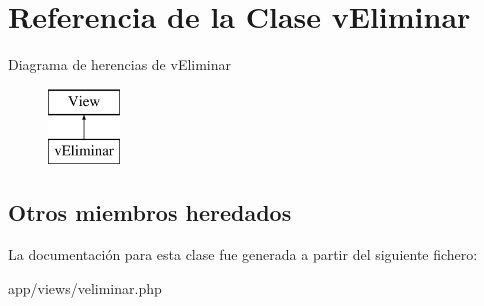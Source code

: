 \hypertarget{classv_eliminar}{}\section{Referencia de la Clase v\+Eliminar}
\label{classv_eliminar}
Diagrama de herencias de v\+Eliminar\begin{figure}[H]
\begin{center}
\leavevmode
\includegraphics[height=2.000000cm]{classv_eliminar}
\end{center}
\end{figure}
\subsection*{Otros miembros heredados}


La documentación para esta clase fue generada a partir del siguiente fichero\+:\begin{DoxyCompactItemize}
\item 
app/views/veliminar.\+php\end{DoxyCompactItemize}
